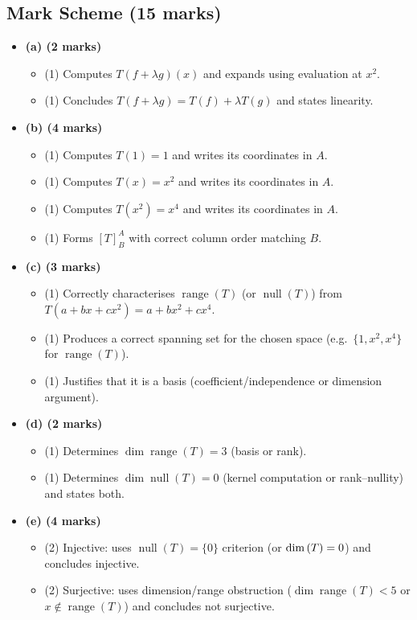 \documentclass[12pt]{article}
\begin{document}
\subsection{Mark Scheme (15 marks)}
\begin{itemize}[leftmargin=1.6em]
  \item \textbf{(a) (2 marks)}
  \begin{itemize}[leftmargin=1.6em]
    \item (1) Computes $T(f+\lambda g)(x)$ and expands using evaluation at $x^2$.
    \item (1) Concludes $T(f+\lambda g)=T(f)+\lambda T(g)$ and states linearity.
  \end{itemize}

  \item \textbf{(b) (4 marks)}
  \begin{itemize}[leftmargin=1.6em]
    \item (1) Computes $T(1)=1$ and writes its coordinates in $A$.
    \item (1) Computes $T(x)=x^2$ and writes its coordinates in $A$.
    \item (1) Computes $T(x^2)=x^4$ and writes its coordinates in $A$.
    \item (1) Forms $[T]_B^A$ with correct column order matching $B$.
  \end{itemize}

  \item \textbf{(c) (3 marks)}
  \begin{itemize}[leftmargin=1.6em]
    \item (1) Correctly characterises $\operatorname{range}(T)$ (or $\operatorname{null}(T)$) from $T(a+bx+cx^2)=a+bx^2+cx^4$.
    \item (1) Produces a correct spanning set for the chosen space (e.g.\ $\{1,x^2,x^4\}$ for $\operatorname{range}(T)$).
    \item (1) Justifies that it is a basis (coefficient/independence or dimension argument).
  \end{itemize}

  \item \textbf{(d) (2 marks)}
  \begin{itemize}[leftmargin=1.6em]
    \item (1) Determines $\dim\operatorname{range}(T)=3$ (basis or rank).
    \item (1) Determines $\dim\operatorname{null}(T)=0$ (kernel computation or rank--nullity) and states both.
  \end{itemize}

  \item \textbf{(e) (4 marks)}
  \begin{itemize}[leftmargin=1.6em]
    \item (2) Injective: uses $\operatorname{null}(T)=\{0\}$ criterion (or $\dim\null(T)=0$) and concludes injective.
    \item (2) Surjective: uses dimension/range obstruction ($\dim\operatorname{range}(T)<5$ or $x\notin\operatorname{range}(T)$) and concludes not surjective.
  \end{itemize}
\end{itemize}
\end{document}
